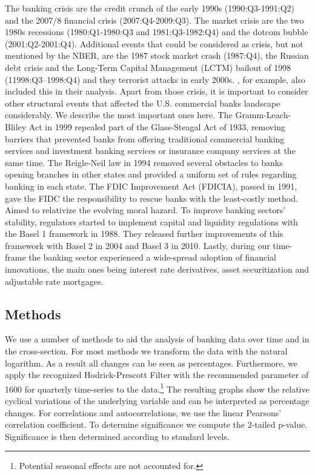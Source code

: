 \documentclass[12pt, a4paper]{article} %
\begin{document}
The banking crisis are the credit crunch of the early 1990s (1990:Q3-1991:Q2) and the 2007/8 financial crisis (2007:Q4-2009:Q3). The market crisis are the two 1980s recessions (1980:Q1-1980:Q3 and 1981:Q3-1982:Q4) and the dotcom bubble (2001:Q2-2001:Q4). Additional events that could be considered as crisis, but not mentioned by the NBER, are the 1987 stock market crash (1987:Q4), the Russian debt crisis and the  Long-Term Capital Management (LCTM) bailout of 1998 (11998:Q3–1998:Q4) and they terrorist attacks in early 2000s. \citet{BergerBouwman2013}, for example, also included this in their analysis.
Apart from those crisis, it is important to consider other structural events that affected the U.S. commercial banks landscape considerably. We describe the most important ones here. 
The Gramm-Leach-Bliley Act in 1999 repealed part of the Glass-Steagal Act of 1933, removing barriers that prevented banks from offering traditional commercial banking services and investment banking services or insurance company services at the same time.  
The Reigle-Neil law in 1994 removed several obstacles to banks opening branches in other states and provided a uniform set of rules regarding banking in each state.
The FDIC Improvement Act (FDICIA), passed in 1991, gave the FIDC the responsibility to rescue banks with the least-costly method. Aimed to relativize the evolving moral hazard. To improve banking sectors' stability, regulators started to implement capital and liquidity regulations with the Basel 1 framework in 1988. They released further improvements of this framework with Basel 2 in 2004 and Basel 3 in 2010. Lastly, during our time-frame the banking sector experienced a wide-spread adoption of financial innovations, the main ones being interest rate derivatives, asset securitization and adjustable rate mortgages. 



\subsection{Methods}

We use a number of methods to aid the analysis of banking data over time and in the cross-section.
For most methods we transform the data with the natural logarithm. As a result all changes can be seen as percentages. Furthermore, we apply the recognized Hodrick-Prescott Filter with the recommended parameter of 1600 for quarterly time-series to the data.\footnote{Potential seasonal effects are not accounted for.} The resulting graphs show the relative cyclical variations of the underlying variable and can be interpreted as percentage changes. For correlations and autocorrelations, we use the linear Pearsons' correlation coefficient. To determine significance we compute the 2-tailed p-value. Significance is then determined according to standard levels.

\end{document}
